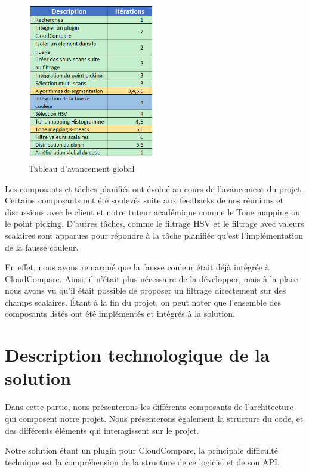 \documentclass[12pt,titlepage,french]{article}
\begin{document}
\begin{figure}[H]
\center \includegraphics[width=0.5\textwidth]{./img/avancement.png}
  \caption{\label{} Tableau d'avancement global}
\end{figure}

Les composants et tâches planifiés ont évolué au cours de l'avancement du projet.
Certains composants ont été soulevés suite aux feedbacks de nos réunions et discussions avec le client et notre tuteur académique comme le Tone mapping ou le point picking.
D'autres tâches, comme le filtrage HSV et le filtrage avec valeurs scalaires sont apparues pour répondre à la tâche planifiée qu'est l'implémentation de la fausse couleur.\newline

En effet, nous avons remarqué que la fausse couleur était déjà intégrée à CloudCompare.
Ainsi, il n'était plus nécessaire de la développer, mais à la place nous avons vu qu'il était possible de proposer un filtrage directement sur des champs scalaires.
Étant à la fin du projet, on peut noter que l'ensemble des composants listés ont été implémentés et intégrés à la solution.

\section{Description technologique de la solution}

Dans cette partie, nous présenterons les différents composants de l'architecture qui composent notre projet. Nous présenterons également la structure du code, et des différents éléments qui interagissent sur le projet.

Notre solution étant un plugin pour CloudCompare, la principale difficulté technique est la compréhension de la structure de ce logiciel et de son API. \newline
\end{document}
